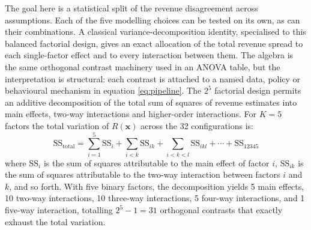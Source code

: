 \documentclass[11pt,a4paper]{article}
\begin{document}
The goal here is a statistical split of the revenue disagreement across assumptions. Each of the five modelling choices can be tested on its own, as can their combinations. A classical variance-decomposition identity, specialised to this balanced factorial design, gives an exact allocation of the total revenue spread to each single-factor effect and to every interaction between them. The algebra is the same orthogonal contrast machinery used in an ANOVA table, but the interpretation is structural: each contrast is attached to a named data, policy or behavioural mechanism in equation \eqref{eq:pipeline}. The $2^5$ factorial design permits an additive decomposition of the total sum of squares of revenue estimates into main effects, two-way interactions and higher-order interactions. For $K = 5$ factors the total variation of $R(\mathbf{x})$ across the 32 configurations is:
\begin{equation}\label{eq:anova}
\text{SS}_{\text{total}} = \sum_{i=1}^{5} \text{SS}_i + \sum_{i<k} \text{SS}_{ik} + \sum_{i<k<l} \text{SS}_{ikl} + \cdots + \text{SS}_{12345}
\end{equation}
where $\text{SS}_i$ is the sum of squares attributable to the main effect of factor $i$, $\text{SS}_{ik}$ is the sum of squares attributable to the two-way interaction between factors $i$ and $k$, and so forth. With five binary factors, the decomposition yields 5 main effects, 10 two-way interactions, 10 three-way interactions, 5 four-way interactions, and 1 five-way interaction, totalling $2^5 - 1 = 31$ orthogonal contrasts that exactly exhaust the total variation.
\end{document}
